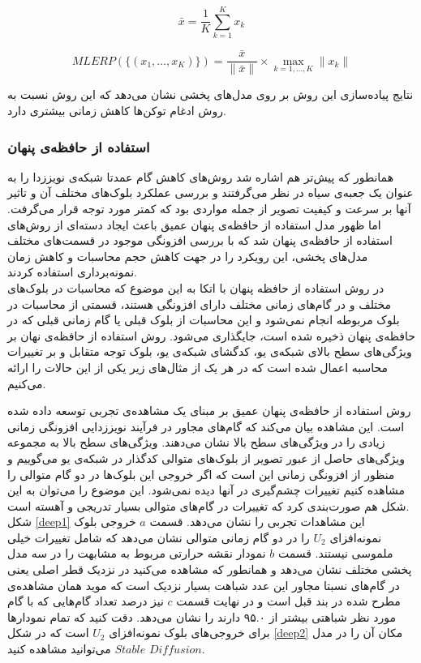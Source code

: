 \begin{equation}
	\bar{x} = \frac{1}{K}\sum_{k=1}^{K}x_{k}
\end{equation}
	
\begin{equation}
	MLERP(\{(x_{1}, \dots, x_{K})\}) = \frac{\bar{x}}{\|\bar{x}\|} \times \max_{k=1,\dots,K}\|x_{k}\| 
\end{equation}

نتایج پیاده‌سازی این روش بر روی مدل‌های پخشی نشان می‌دهد که این روش نسبت به روش ادغام توکن‌ها کاهش زمانی بیشتری دارد.


\subsubsection{استفاده‌ از حافظه‌ی پنهان}
همانطور که پیش‌تر هم اشاره شد روش‌های کاهش گام عمدتا شبکه‌ی نویززدا را به عنوان یک جعبه‌ی سیاه در نظر می‌گرفتند و بررسی عملکرد بلوک‌های مختلف آن و تاثیر آنها بر سرعت و کیفیت تصویر از جمله مواردی بود که کمتر مورد توجه قرار می‌گرفت\cite{wimbauer2024cache}. اما ظهور مدل استفاده از حافظه‌ی پنهان عمیق \cite{ma2024deepcache} باعث ایجاد دسته‌ای از روش‌های استفاده از حافظه‌ی پنهان شد که با بررسی افزونگی موجود در قسمت‌های مختلف مدل‌های پخشی، این رویکرد را در جهت کاهش حجم محاسبات و کاهش زمان نمونه‌برداری استفاده کردند.
\\
در روش استفاده از حافظه پنهان با اتکا به این موضوع که محاسبات در بلوک‌های مختلف و در گام‌های زمانی مختلف دارای افزونگی هستند، قسمتی از محاسبات در بلوک مربوطه انجام نمی‌شود و این محاسبات از بلوک قبلی یا گام زمانی قبلی که در حافظه‌ی پنهان ذخیره شده است، جایگذاری می‌شود. روش استفاده از حافظه‌ی نهان بر ویژگی‌های سطح بالای شبکه‌ی یو، کدگشای شبکه‌ی یو، بلوک توجه متقابل و بر تغییرات محاسبه اعمال شده است که در هر یک از مثال‌های زیر یکی از این حالات را ارائه می‌کنیم.


روش استفاده از حافظه‌ی پنهان عمیق\cite{ma2024deepcache} بر مبنای یک مشاهده‌ی تجربی توسعه داده شده است. این مشاهده بیان می‌کند که گام‌های مجاور در فرآیند نویززدایی افزونگی زمانی زیادی را در ویژگی‌های سطح بالا نشان‌ می‌دهند. ویژگی‌های سطح بالا به مجموعه ویژگی‌های حاصل از عبور تصویر از بلوک‌های متوالی کدگذار در شبکه‌ی یو می‌گوییم و منظور از افزونگی زمانی این است که اگر خروجی این بلوک‌ها در دو گام متوالی را مشاهده کنیم تغییرات چشم‌گیری در آنها دیده نمی‌شود. این موضوع را می‌توان به این شکل هم صورت‌بندی کرد که تغییرات در گام‌های متوالی بسیار تدریجی و آهسته است.
\\
شکل \ref{deep1} این مشاهدات تجربی را نشان می‌دهد. قسمت $a$ خروجی بلوک نمونه‌افزای $U_2$ را در دو گام زمانی متوالی نشان‌ می‌دهد که شامل تغییرات خیلی ملموسی نیستند. قسمت $b$ نمودار نقشه حرارتی مربوط به مشابهت را در سه مدل پخشی مختلف نشان می‌دهد و همانطور که مشاهده می‌کنید در نزدیک قطر اصلی یعنی در گام‌های نسبتا مجاور این عدد شباهت بسیار نزدیک است که موید همان مشاهده‌ی مطرح شده در بند قبل است و در نهایت قسمت $c$ نیز درصد تعداد گام‌هایی که با گام مورد نظر شباهتی بیشتر از ۹۵.۰ دارند را نشان می‌دهد. دقت کنید که تمام نمودارها برای خروجی‌های بلوک نمونه‌افزای $U_2$ است که در شکل \ref{deep2} مکان آن را در مدل $Diffusion$ $Stable$ می‌توانید مشاهده کنید.
\\

